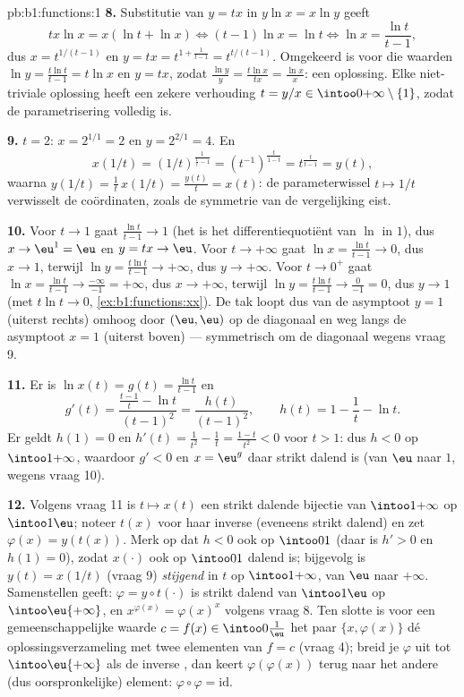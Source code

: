 \begin{solution}{pb:b1:functions:1}
\textbf{8.} Substitutie van $y = tx$ in $y\ln x = x\ln y$ geeft
\[
tx\ln x = x(\ln t + \ln x)
\iff (t - 1)\ln x = \ln t
\iff \ln x = \frac{\ln t}{t - 1} ,
\]
dus $x = t^{1/(t-1)}$ en $y = tx = t^{1 + \frac1{t-1}} = t^{t/(t-1)}$.
Omgekeerd is voor die waarden $\ln y = \frac{t\ln t}{t-1} = t\ln x$ en $y
= tx$, zodat $\frac{\ln y}y = \frac{t\ln x}{tx} = \frac{\ln x}x$: een
oplossing. Elke niet-triviale oplossing heeft een zekere verhouding $t =
y/x \in \intoo0{+\infty} \setminus \{1\}$, zodat de parametrisering
volledig is.

\textbf{9.} $t = 2$: $x = 2^{1/1} = 2$ en $y = 2^{2/1} = 4$. En
\[
x(1/t) = (1/t)^{\frac1{\frac1t - 1}}
= (t^{-1})^{\frac{t}{1 - t}}
= t^{\frac{t}{t - 1}} = y(t) ,
\]
waarna $y(1/t) = \frac1t\,x(1/t) = \frac{y(t)}t = x(t)$: de
parameterwissel $t \mapsto 1/t$ verwisselt de coördinaten, zoals de
symmetrie van de vergelijking eist.

\textbf{10.} Voor $t \to 1$ gaat $\frac{\ln t}{t-1} \to 1$ (het is het
differentiequotiënt van $\ln$ in $1$), dus $x \to \eu^1 = \eu$ en $y =
tx \to \eu$. Voor $t \to +\infty$ gaat $\ln x = \frac{\ln t}{t-1} \to 0$,
dus $x \to 1$, terwijl $\ln y = \frac{t\ln t}{t-1} \to +\infty$, dus $y
\to +\infty$. Voor $t \to 0^+$ gaat $\ln x = \frac{\ln t}{t-1} \to
\frac{-\infty}{-1} = +\infty$, dus $x \to +\infty$, terwijl $\ln y =
\frac{t\ln t}{t-1} \to \frac{0}{-1} = 0$, dus $y \to 1$ (met $t\ln t \to
0$, \cref{ex:b1:functions:xx}). De tak loopt dus van de asymptoot $y = 1$
(uiterst rechts) omhoog door $(\eu, \eu)$ op de diagonaal en weg langs de
asymptoot $x = 1$ (uiterst boven) --- symmetrisch om de diagonaal wegens
vraag 9.

\textbf{11.} Er is $\ln x(t) = g(t) = \frac{\ln t}{t-1}$ en
\[
g'(t) = \frac{\frac{t-1}t - \ln t}{(t-1)^2}
= \frac{h(t)}{(t-1)^2},
\qquad h(t) = 1 - \frac1t - \ln t .
\]
Er geldt $h(1) = 0$ en $h'(t) = \frac1{t^2} - \frac1t = \frac{1 -
t}{t^2} < 0$ voor $t > 1$: dus $h < 0$ op $\intoo1{+\infty}$, waardoor
$g' < 0$ en $x = \eu^g$ daar strikt dalend is (van $\eu$ naar $1$,
wegens vraag 10).

\textbf{12.} Volgens vraag 11 is $t \mapsto x(t)$ een strikt dalende
bijectie van $\intoo1{+\infty}$ op $\intoo1\eu$; noteer $t(x)$ voor haar
inverse (eveneens strikt dalend) en zet $\varphi(x) = y(t(x))$. Merk op
dat $h < 0$ ook op $\intoo01$ (daar is $h' > 0$ en $h(1) = 0$), zodat
$x(\cdot)$ ook op $\intoo01$ dalend is; bijgevolg is $y(t) = x(1/t)$
(vraag 9) \emph{stijgend} in $t$ op $\intoo1{+\infty}$, van $\eu$ naar
$+\infty$. Samenstellen geeft: $\varphi = y \circ t(\cdot)$ is strikt
dalend van $\intoo1\eu$ op $\intoo\eu{+\infty}$, en $x^{\varphi(x)} =
\varphi(x)^x$ volgens vraag 8. Ten slotte is voor een gemeenschappelijke
waarde $c = f(x) \in \intoo0{\frac1\eu}$ het paar $\{x, \varphi(x)\}$ dé
oplossingsverzameling met twee elementen van $f = c$ (vraag 4); breid je
$\varphi$ uit tot $\intoo\eu{+\infty}$ als de inverse , dan
keert $\varphi(\varphi(x))$ terug naar het andere (dus oorspronkelijke)
element: $\varphi \circ \varphi = \mathrm{id}$.


\end{solution}
